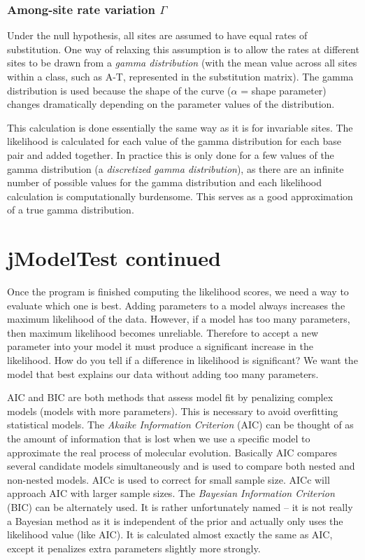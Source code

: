 \documentclass[11pt]{article}
\begin{document}
\subsubsection{Among-site rate variation $\Gamma$}

Under the null hypothesis, all sites are assumed to have equal rates of substitution.  One way of relaxing this assumption is to allow the rates at different sites to be drawn from a \textit{gamma distribution} (with the mean value across all sites within a class, such as A-T, represented in the substitution matrix).  The gamma distribution is used because the shape of the curve ($\alpha$ = shape parameter) changes dramatically depending on the parameter values of the distribution.  

This calculation is done essentially the same way as it is for invariable sites.  
The likelihood is calculated for each value of the gamma distribution for each base pair and added together.  
In practice this is only done for a few values of the gamma distribution
(a \textit{discretized gamma distribution}), 
as there are an infinite number of possible values for the gamma distribution 
and each likelihood calculation is computationally burdensome.  This serves as a good approximation of a true gamma distribution.


\section{jModelTest continued}


Once the program is finished computing the likelihood scores, we need a way to evaluate which one is best.  Adding parameters to a model always increases the maximum likelihood of the data.  However, if a model has too many parameters, then maximum likelihood becomes unreliable.  Therefore to accept a new parameter into your model it must produce a significant increase in the likelihood.  How do you tell if a difference in likelihood is significant?  We want the model that best explains our data without adding too many parameters.

AIC and BIC are both methods that assess model fit by penalizing complex models (models with more parameters).
This is necessary to avoid overfitting statistical models.
The \textit{Akaike Information Criterion} (AIC) can be thought of as the amount of information that is lost when we use 
a specific model to approximate the real process of molecular evolution.  
Basically AIC compares several candidate models simultaneously and is used to compare both nested and non-nested models.  
AICc is used to correct for small sample size.  AICc will approach AIC with larger sample sizes.
The \textit{Bayesian Information Criterion} (BIC) can be alternately used.  
It is rather unfortunately named -- it is not really a Bayesian method
as it is independent of the prior and actually only uses the likelihood value (like AIC).
It is calculated almost exactly the same as AIC, except it penalizes
extra parameters slightly more strongly.
\end{document}
